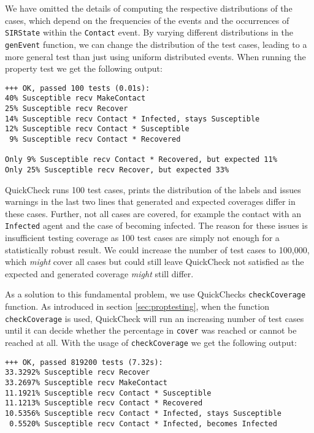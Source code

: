 We have omitted the details of computing the respective distributions of the cases, which depend on the frequencies of the events and the occurrences of \texttt{SIRState} within the \texttt{Contact} event. By varying different distributions in the \texttt{genEvent} function, we can change the distribution of the test cases, leading to a more general test than just using uniform distributed events. When running the property test we get the following output:

\begin{footnotesize}
\begin{verbatim}
+++ OK, passed 100 tests (0.01s):
40% Susceptible recv MakeContact
25% Susceptible recv Recover
14% Susceptible recv Contact * Infected, stays Susceptible
12% Susceptible recv Contact * Susceptible
 9% Susceptible recv Contact * Recovered
    
Only 9% Susceptible recv Contact * Recovered, but expected 11%
Only 25% Susceptible recv Recover, but expected 33%
\end{verbatim}
\end{footnotesize}

QuickCheck runs 100 test cases, prints the distribution of the labels and issues warnings in the last two lines that generated and expected coverages differ in these cases. Further, not all cases are covered, for example the contact with an \texttt{Infected} agent and the case of becoming infected. The reason for these issues is insufficient testing coverage as 100 test cases are simply not enough for a statistically robust result. We could increase the number of test cases to 100,000, which \textit{might} cover all cases but could still leave QuickCheck not satisfied as the expected and generated coverage \textit{might} still differ.

\medskip

As a solution to this fundamental problem, we use QuickChecks \texttt{checkCoverage} function. As introduced in section \ref{sec:proptesting}, when the function \texttt{checkCoverage} is used, QuickCheck will run an increasing number of test cases until it can decide whether the percentage in \texttt{cover} was reached or cannot be reached at all. With the usage of \texttt{checkCoverage} we get the following output:

\begin{footnotesize}
\begin{verbatim}
+++ OK, passed 819200 tests (7.32s):
33.3292% Susceptible recv Recover
33.2697% Susceptible recv MakeContact
11.1921% Susceptible recv Contact * Susceptible
11.1213% Susceptible recv Contact * Recovered
10.5356% Susceptible recv Contact * Infected, stays Susceptible
 0.5520% Susceptible recv Contact * Infected, becomes Infected
\end{verbatim}
\end{footnotesize}

